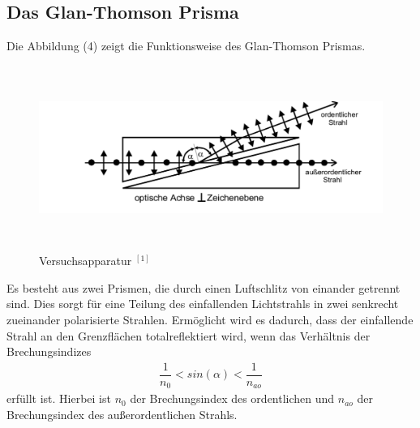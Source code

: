 \documentclass{article}
\begin{document}
\subsection{ Das Glan-Thomson Prisma}
Die Abbildung (4) zeigt die Funktionsweise des Glan-Thomson Prismas. 
\begin{figure}[H]
	\centering
	\includegraphics[height=6cm, width=14cm]{prisma.png}
	\caption{ Versuchsapparatur $^{[1]}$}   
	\label{fig: abb. 1}
\end{figure}
Es besteht aus zwei Prismen, die durch einen Luftschlitz von einander getrennt sind. Dies sorgt für eine Teilung des einfallenden Lichtstrahls in zwei senkrecht zueinander polarisierte Strahlen. Ermöglicht wird es dadurch, dass der einfallende Strahl an den Grenzflächen totalreflektiert wird, wenn das Verhältnis der Brechungsindizes 
\begin{align}
\dfrac{1}{n_0}<sin(\alpha)<\dfrac{1}{n_{ao}}
\end{align}
erfüllt ist. Hierbei ist $n_0$ der Brechungsindex des ordentlichen und $n_{ao}$ der Brechungsindex des außerordentlichen Strahls. 
	
\end{document}
